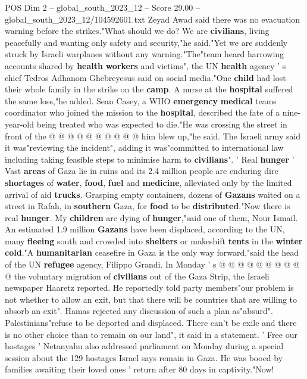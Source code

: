 \begin{textsample}{POS Dim 2 – global\_south\_2023\_12 – Score 29.00 – global\_south\_2023\_12/104592601.txt}
Zeyad Awad said there was no evacuation warning before the strikes."What should we do?
We are \textbf{civilians}, living peacefully and wanting only safety and security,"he said."Yet we are suddenly struck by Israeli warplanes without any warning."The"team heard harrowing accounts shared by \textbf{health} \textbf{workers} and victims", the UN \textbf{health} agency ' s chief Tedros Adhanom Ghebreyesus said on social media."One \textbf{child} had lost their whole family in the strike on the \textbf{camp}.
A nurse at the \textbf{hospital} suffered the same loss,"he added.
Sean Casey, a WHO \textbf{emergency} \textbf{medical} teams coordinator who joined the mission to the \textbf{hospital}, described the fate of a nine-year-old being treated who was expected to die."He was crossing the street in front of the @ @ @ @ @ @ @ @ @ @ him blew up,"he said.
The Israeli army said it was"reviewing the incident", adding it was"committed to international law including taking feasible steps to minimise harm to \textbf{civilians}". ' Real \textbf{hunger} ' Vast \textbf{areas} of Gaza lie in ruins and its 2.4 million people are enduring dire \textbf{shortages} of \textbf{water}, \textbf{food}, \textbf{fuel} and \textbf{medicine}, alleviated only by the limited arrival of aid \textbf{trucks}.
Grasping empty containers, dozens of \textbf{Gazans} waited on a street in Rafah, in \textbf{southern} Gaza, for \textbf{food} to be \textbf{distributed}."Now there is real \textbf{hunger}.
My \textbf{children} are dying of \textbf{hunger},"said one of them, Nour Ismail.
An estimated 1.9 million \textbf{Gazans} have been displaced, according to the UN, many \textbf{fleeing} south and crowded into \textbf{shelters} or makeshift \textbf{tents} in the \textbf{winter} \textbf{cold}."A \textbf{humanitarian} ceasefire in Gaza is the only way forward,"said the head of the UN \textbf{refugee} agency, Filippo Grandi.
In Monday ' s @ @ @ @ @ @ @ @ @ @ the voluntary migration of \textbf{civilians} out of the Gaza Strip, the Israeli newspaper Haaretz reported.
He reportedly told party members"our problem is not whether to allow an exit, but that there will be countries that are willing to absorb an exit".
Hamas rejected any discussion of such a plan as"absurd".
Palestinians"refuse to be deported and displaced.
There can't be exile and there is no other choice than to remain on our land", it said in a statement. ' Free our hostages ' Netanyahu also addressed parliament on Monday during a special session about the 129 hostages Israel says remain in Gaza.
He was booed by families awaiting their loved ones ' return after 80 days in captivity."Now!

\end{textsample}
